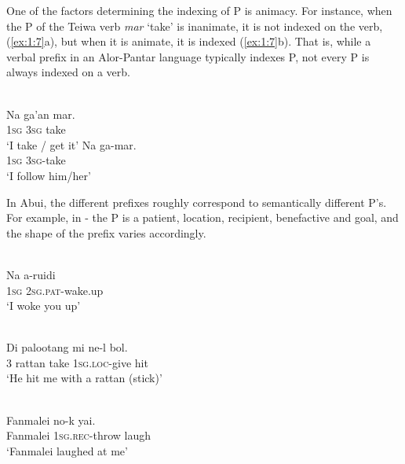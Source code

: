 {One of the factors determining the indexing of P is animacy. For instance, when the P of the Teiwa verb \textit{mar} `take' is inanimate, it is not indexed on the verb, (\ref{ex:1:7}a), but when it  is animate, it is indexed (\ref{ex:1:7}b). That is, while a verbal prefix in an Alor-Pantar language typically indexes P, not every P is always indexed on a verb.



\ea%
\label{ex:1:7}
\\
\gll Na  ga'an  mar. \\
  1\textsc{sg} 3\textsc{sg} take     \\
\glt `I take / get it'
\ex
\gll Na  ga-mar. \\
1\textsc{sg} 3\textsc{sg}{}-take  \\
\glt  `I follow him/her'
\z
  


In Abui, the different prefixes roughly correspond to semantically different P's. For example, in - the P is a patient, location, recipient, benefactive and goal, and the shape of the prefix varies accordingly.



\ea%
\label{ex:1:8}
 \\
\gll Na   a-ruidi  \\
 \textsc{1sg}   \textsc{2sg.pat}{}-wake.up  \\
\glt  `I woke you up' 
\z
            



 

\ea%
\label{ex:1:9}
 \\
\gll Di   palootang   mi   ne-l     bol.  \\
 3   rattan     take   \textsc{1sg.loc-}give  hit  \\
\glt  `He hit me with a rattan (stick)'
\z

\textit{}





\ea%
\label{ex:1:10}
 \\
\gll Fanmalei   no-k       yai.  \\
Fanmalei   \textsc{1sg.rec-}throw   laugh   \\
\glt  `Fanmalei  laughed at me'
\z
 


}
